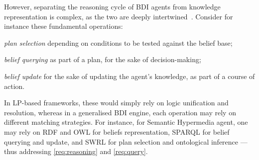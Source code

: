 However,
separating the reasoning cycle of \ac{BDI} agents from knowledge representation is complex,
as the two are deeply intertwined~\cite{DBLP:conf/dalt/MoreiraVBH05}.
%
Consider for instance these fundamental operations:
%
\begin{inlinelist}
  \item \emph{plan selection}
  depending on conditions to be tested against the belief base;

  \item \emph{belief querying}
  as part of a plan, for the sake of decision-making;

  \item \emph{belief update}
  for the sake of updating the agent's knowledge,
  as part of a course of action.
\end{inlinelist}
%
In \ac{LP}-based frameworks,
these would simply rely on logic unification and resolution,
whereas in a generalised \ac{BDI} engine,
each operation may rely on different matching strategies.
%
For instance,
for Semantic Hypermedia agent,
one may rely on \ac{RDF} and \ac{OWL} for beliefs representation,
\acs{SPARQL} for belief querying and update,
and \ac{SWRL} for plan selection and ontological inference%
%
---thus addressing \ref{req:reasoning} and \ref{req:query}.

